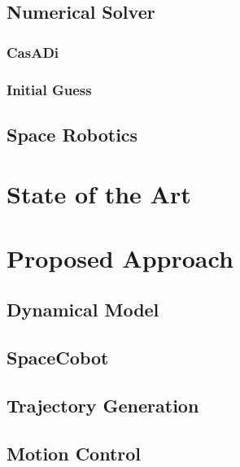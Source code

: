 \documentclass[a4paper, oneside]{article}
\begin{document}
\subsection{Numerical Solver}
\subsubsection{CasADi}


\subsubsection{Initial Guess}


\subsection{Space Robotics}





\clearpage
\section{State of the Art}


\clearpage
\section{Proposed Approach}

\subsection{Dynamical Model}


\subsection{SpaceCobot}\label{sec:Proposed Approach: Space Cobot}



\subsection{Trajectory Generation}

\subsection{Motion Control}
\end{document}
